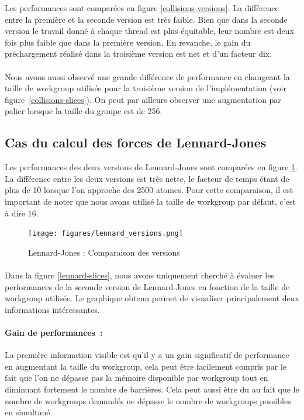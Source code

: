\documentclass{article}
\begin{document}
Les performances sont comparées en figure \ref{collisions-versions}. La différence entre la première et la seconde version est très faible. Bien
que dans la seconde version le travail donné à chaque thread est plus
équitable, leur nombre est deux fois plus faible que dans la première version.
En revanche, le gain du préchargement réalisé dans la troisième version est
net et d'un facteur dix.
\paragraph{}
Nous avons aussi observé une grande différence de performance en
changeant la taille de workgroup utilisée pour la troisième version
de l'implémentation (voir figure~\ref{collisions-slices}). On peut par
ailleurs observer une augmentation par palier lorsque la taille du groupe est
de 256.

\subsection{Cas du calcul des forces de Lennard-Jones}

Les performances des deux versions de Lennard-Jones sont comparées en figure
\ref{lennard-versions}. La différence entre les deux versions est très nette,
le facteur de temps étant de plus de 10 lorsque l'on approche des 2500 atomes.
Pour cette comparaison, il est important de noter que nous avons utilisé la
taille de workgroup par défaut, c'est à dire 16.
\begin{figure}[p]
	\caption{Lennard-Jones : Comparaison des versions}
	\label{lennard-versions}
	\texttt{[image: figures/lennard\_versions.png]}
\end{figure}
\paragraph{}
Dans la figure \ref{lennard-slices}, nous avons uniquement cherché à évaluer les
performances de la seconde version de Lennard-Jones en fonction de la taille de
workgroup utilisée. Le graphique obtenu permet de visualiser principalement deux
informations intéressantes.
\paragraph{Gain de performances~:}
La première information visible est qu'il y a un gain significatif de
performance en augmentant la taille du workgroup, cela peut être facilement
compris par le fait que l'on ne dépasse pas la mémoire disponible par workgroup
tout en diminuant fortement le nombre de barrières. Cela peut aussi être du au
fait que le nombre de workgroups demandés ne dépasse le nombre de workgroups
possibles en simultané.
\end{document}
